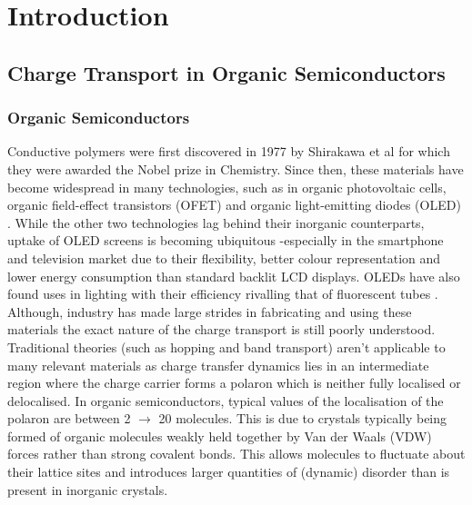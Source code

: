 \chapter{Introduction}
\label{chap:intro}

\section{Charge Transport in Organic Semiconductors}
\subsection{Organic Semiconductors}
Conductive polymers were first discovered in 1977 by Shirakawa et al  \cite{chiang_electrical_1977, Shirakawa1977Jan} for which they were awarded the Nobel prize in Chemistry. Since then, these materials have become widespread in many technologies, such as in organic photovoltaic cells\cite{Kippelen2009}, organic field-effect transistors (OFET) \cite{Malachowski2010Jun} and organic light-emitting diodes (OLED) \cite{ThejoKalyani2012Jun}. While the other two technologies lag behind their inorganic counterparts, uptake of OLED screens is becoming ubiquitous -especially in the smartphone and television market due to their flexibility, better colour representation and lower energy consumption than standard backlit LCD displays. OLEDs have also found uses in lighting with their efficiency rivalling that of fluorescent tubes \cite{Reineke2009May, OLED_lighting}. Although, industry has made large strides in fabricating and using these materials the exact nature of the charge transport is still poorly understood. Traditional theories (such as hopping and band transport) aren't applicable to many relevant materials \cite{coropceanu_charge_2007, Giannini2019, C0CS00198H, Fratini_2016, yavuz_dichotomy_2017} as charge transfer dynamics lies in an intermediate region where the charge carrier forms a polaron which is neither fully localised or delocalised. In organic semiconductors, typical values of the localisation of the polaron are between 2 $\rightarrow$ 20 molecules. This is due to crystals typically being formed of organic molecules weakly held together by Van der Waals (VDW) forces rather than strong covalent bonds. This allows molecules to fluctuate about their lattice sites and introduces larger quantities of (dynamic) disorder than is present in inorganic crystals. 
\\\\
